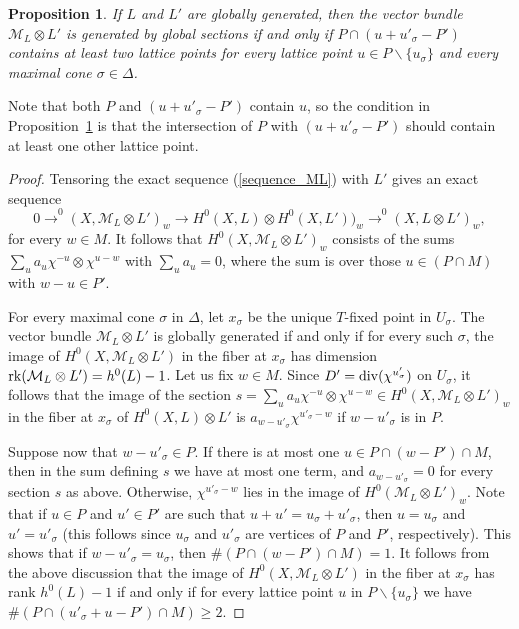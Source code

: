 \documentclass[12pt]{amsart}
\newtheorem{proposition}[lemma]{Proposition}
\theoremstyle{definition}
\theoremstyle{remark}
\begin{document}
\begin{proposition}  \label{prop:globgen}
If $L$ and $L'$ are globally generated, then the vector bundle ${\mathcal{M}}_L \otimes L'$ is generated by global sections if and only if $P \cap (u + u'_\sigma - P')$ contains at least two lattice points for every lattice point $u \in P \smallsetminus \{u_\sigma\}$ and every maximal cone $\sigma \in \Delta$.
\end{proposition}

\noindent Note that both $P$ and $(u + u'_\sigma - P')$ contain $u$, so the condition in Proposition~\ref{prop:globgen} is that the intersection of $P$ with $(u+u'_{\sigma}-P')$ should contain at least one other lattice point.

\begin{proof}
Tensoring the exact sequence (\ref{sequence_ML}) with $L'$ 
gives an exact sequence
$$0{\xrightarrow{\ \ }}^0(X, {\mathcal{M}}_L\otimes L')_w{\xrightarrow{\ \ }}H^0(X, L)\otimes H^0(X, L'))_w{\xrightarrow{\ \ }}^0(X, L\otimes L')_w,$$
for every $w \in M$.
It follows that
$H^0(X, {\mathcal{M}}_L\otimes L')_w$
consists of the sums  $\sum_u a_u\chi^{-u}\otimes\chi^{u-w}$ with $\sum_ua_u=0$, where the sum is over those  $u\in (P\cap M)$ with $w-u\in P'$. 

For every maximal cone $\sigma$ in $\Delta$, let
 $x_\sigma$ be the unique $T$-fixed point in $U_\sigma$. The vector bundle 
 ${\mathcal{M}}_L\otimes L'$ is globally generated if and only if for every such $\sigma$, the image of
 $H^0(X, {\mathcal{M}}_L\otimes L')$ in the fiber at $x_{\sigma}$ has dimension ${\rm rk}({\mathcal{M}}_L\otimes L')=h^0(L)-1$. Let us fix $w\in M$.
 Since $D'={\rm div}(\chi^{u'_{\sigma}})$ on $U_{\sigma}$, 
 it follows that the image of the section
 $s=\sum_ua_u\chi^{-u}\otimes\chi^{u-w}\in H^0(X, {\mathcal{M}}_L\otimes L')_w$ in the fiber at $x_{\sigma}$
of $H^0(X, L)\otimes L'$ is $a_{w-u'_{\sigma}}\chi^{u'_{\sigma}-w}$ if $w-u'_{\sigma}$ is in $P$.

Suppose now that $w-u'_{\sigma}\in P$.
If there is at most one $u\in P\cap (w-P')\cap M$, then in the sum defining $s$ we have at most one term, and $a_{w-u'_{\sigma}}=0$ for every section
$s$ as above. Otherwise, $\chi^{u'_{\sigma}-w}$ lies in the image of $H^0({\mathcal{M}}_L\otimes L')_w$.
Note that if $u\in P$ and $u'\in P'$ are such that $u+u'=u_{\sigma}+u'_{\sigma}$, then 
$u=u_{\sigma}$ and $u'=u'_{\sigma}$ (this follows since $u_{\sigma}$ and $u'_{\sigma}$
are vertices of $P$ and $P'$, respectively). This shows that if $w - u'_{\sigma}=u_{\sigma}$, then 
$\#(P\cap (w-P')\cap M)=1$. It follows from the above discussion that the image of
$H^0(X, {\mathcal{M}}_L\otimes L')$ in the fiber at $x_{\sigma}$ has rank $h^0(L)-1$ if and only if
for every lattice point $u$ in $P\smallsetminus\{u_{\sigma}\}$ we have
$\#(P\cap (u'_{\sigma}+u-P')\cap M)\geq 2$.
\end{proof}
\end{document}
